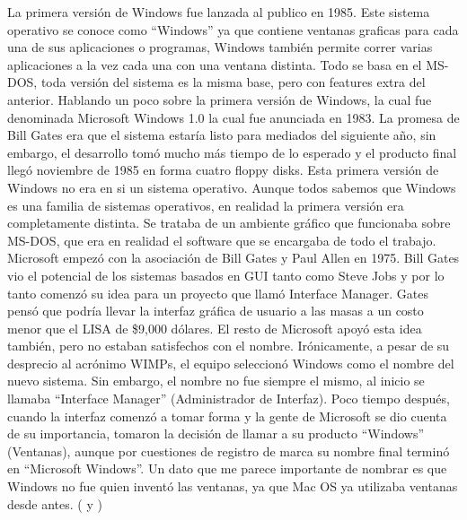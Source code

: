 \documentclass[stu, 12pt, letterpaper, donotrepeattitle, floatsintext, natbib, helv]{apa7}
\begin{document}
La primera versión de Windows fue lanzada al publico en 1985. Este sistema operativo se conoce como “Windows” ya que contiene ventanas graficas para cada una de sus aplicaciones o programas, Windows también permite correr varias aplicaciones a la vez cada una con una ventana distinta. Todo se basa en el MS-DOS, toda versión del sistema es la misma base, pero con features extra del anterior.
Hablando un poco sobre la primera versión de Windows, la cual fue denominada Microsoft Windows 1.0 la cual fue anunciada en 1983. La promesa de Bill Gates era que el sistema estaría listo para mediados del siguiente año, sin embargo, el desarrollo tomó mucho más tiempo de lo esperado y el producto final llegó noviembre de 1985 en forma cuatro floppy disks. Esta primera versión de Windows no era en si un sistema operativo. Aunque todos sabemos que Windows es una familia de sistemas operativos, en realidad la primera versión era completamente distinta. Se trataba de un ambiente gráfico que funcionaba sobre MS-DOS, que era en realidad el software que se encargaba de todo el trabajo.
Microsoft empezó con la asociación de Bill Gates y Paul Allen en 1975. Bill Gates vio el potencial de los sistemas basados en GUI tanto como Steve Jobs y por lo tanto comenzó su idea para un proyecto que llamó Interface Manager. Gates pensó que podría llevar la interfaz gráfica de usuario a las masas a un costo menor que el LISA de \$9,000 dólares. El resto de Microsoft apoyó esta idea también, pero no estaban satisfechos con el nombre. Irónicamente, a pesar de su desprecio al acrónimo WIMPs, el equipo seleccionó Windows como el nombre del nuevo sistema. Sin embargo, el nombre no fue siempre el mismo, al inicio se llamaba “Interface Manager” (Administrador de Interfaz). Poco tiempo después, cuando la interfaz comenzó a tomar forma y la gente de Microsoft se dio cuenta de su importancia, tomaron la decisión de llamar a su producto “Windows” (Ventanas), aunque por cuestiones de registro de marca su nombre final terminó en “Microsoft Windows”. Un dato que me parece importante de nombrar es que Windows no fue quien inventó las ventanas, ya que Mac OS ya utilizaba ventanas desde antes. (\cite{DatosCuriososWin1} y \cite{QueEsWindows})

\end{document}
